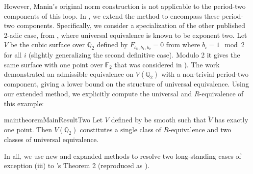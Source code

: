 \documentclass[11pt]{article}
\theoremstyle{definition}
\begin{document}
However, Manin's original norm construction \cite[\S 15]{manin3} is not applicable to the period-two components of this loop. In , we extend the method to encompass these period-two components. Specifically, we consider a specialization
of the other published 2-adic case, from \cite[3.4]{dimitrikanevsky}, where universal equivalence is known to be exponent two. Let $V$ be the cubic surface over $\mathbb{Q}_2$ defined by $F_{b_0, b_1, b_2} = 0$ from  where $b_i = 1 \mod 2$ for all $i$ (slightly generalizing the second definitive case). Modulo 2 it gives the same surface with one point over $\mathbb{F}_2$ that was considered in \cite{swinnertondyer}). The work demonstrated an admissible equivalence on $V(\mathbb{Q}_2)$ with a non-trivial period-two component, giving a lower bound on the structure of universal equivalence. Using our extended method, we explicitly compute the universal and $R$-equivalence of this example:

\begin{restatable}{maintheorem}{MainResultTwo}
\label{single}
Let $V$ defined by  be smooth such that $\tilde{V}$ has exactly one point. Then $V(\mathbb{Q}_2)$ constitutes a single class of $R$-equivalence and two classes of universal equivalence.
\end{restatable}
\noindent In all, we use new and expanded methods to resolve two long-standing cases of exception (iii) to \cite{swinnertondyer}'s Theorem 2 (reproduced as ).
\end{document}
